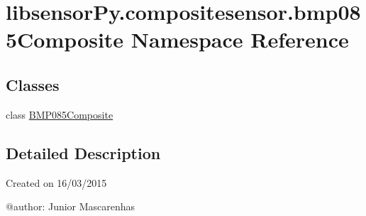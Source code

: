 \hypertarget{namespacelibsensorPy_1_1compositesensor_1_1bmp085Composite}{}\section{libsensor\+Py.\+compositesensor.\+bmp085\+Composite Namespace Reference}
\label{namespacelibsensorPy_1_1compositesensor_1_1bmp085Composite}
\subsection*{Classes}
\begin{DoxyCompactItemize}
\item 
class \hyperlink{classlibsensorPy_1_1compositesensor_1_1bmp085Composite_1_1BMP085Composite}{B\+M\+P085\+Composite}
\end{DoxyCompactItemize}


\subsection{Detailed Description}
\begin{DoxyVerb}Created on 16/03/2015

@author: Junior Mascarenhas
\end{DoxyVerb}
 